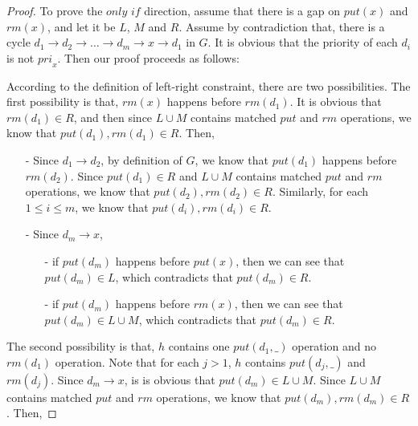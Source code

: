 \begin {proof}

To prove the $\textit{only if}$ direction, assume that there is a gap on $\textit{put}(x)$ and $\textit{rm}(x)$, and let it be $L$, $M$ and $R$. Assume by contradiction that, there is a cycle $d_1 \rightarrow d_2 \rightarrow \ldots \rightarrow d_m \rightarrow x \rightarrow d_1$ in $G$. It is obvious that the priority of each $d_i$ is not $\textit{pri}_x$. Then our proof proceeds as follows:

According to the definition of left-right constraint, there are two possibilities. The first possibility is that, $\textit{rm}(x)$ happens before $\textit{rm}(d_1)$. It is obvious that $\textit{rm}(d_1) \in R$, and then since $L \cup M$ contains matched $\textit{put}$ and $\textit{rm}$ operations, we know that $\textit{put}(d_1),\textit{rm}(d_1) \in R$. Then,

\begin{itemize}
\setlength{\itemsep}{0.5pt}
\item[-] Since $d_1 \rightarrow d_2$, by definition of $G$, we know that $\textit{put}(d_1)$ happens before $\textit{rm}(d_2)$. Since $\textit{put}(d_1) \in R$ and $L \cup M$ contains matched $\textit{put}$ and $\textit{rm}$ operations, we know that $\textit{put}(d_2),\textit{rm}(d_2) \in R$. Similarly, for each $1 \leq i \leq m$, we know that $\textit{put}(d_i),\textit{rm}(d_i) \in R$.

\item[-] Since $d_m \rightarrow x$,
    \begin{itemize}
    \setlength{\itemsep}{0.5pt}
    \item[-] if $\textit{put}(d_m)$ happens before $\textit{put}(x)$, then we can see that $\textit{put}(d_m) \in L$, which contradicts that $\textit{put}(d_m) \in R$.

    \item[-] if $\textit{put}(d_m)$ happens before $\textit{rm}(x)$, then we can see that $\textit{put}(d_m) \in L \cup M$, which contradicts that $\textit{put}(d_m) \in R$.
    \end{itemize}
\end{itemize}

The second possibility is that, $h$ contains one $\textit{put}(d_1,\_)$ operation and no $\textit{rm}(d_1)$ operation. Note that for each $j > 1$, $h$ contains $\textit{put}(d_j,\_)$ and $\textit{rm}(d_j)$. Since $d_m \rightarrow x$, is is obvious that $\textit{put}(d_m) \in L \cup M$. Since $L \cup M$ contains matched $\textit{put}$ and $\textit{rm}$ operations, we know that $\textit{put}(d_m),\textit{rm}(d_m) \in R$. Then,


\end{proof}
